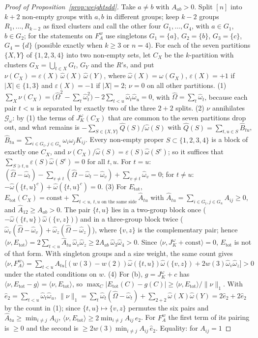 \documentclass[11pt,a4paper]{article}
\theoremstyle{plain}
\theoremstyle{definition}
\theoremstyle{remark}
\newcommand{\tot}{\mathrm{tot}}
\begin{document}
\begin{proof}[Proof of Proposition~\ref{prop:weightsdd}]
Take $a\ne b$ with $A_{ab}>0$. Split $[n]$ into $k+2$ non-empty groups with $a,b$ in different groups; keep $k-2$ groups $R_1,\dots,R_{k-2}$ as fixed clusters and call the other four $G_1,\dots,G_4$, with $a\in G_1$, $b\in G_2$; for the statements on $F^w_A$ use singletons $G_1=\{a\}$, $G_2=\{b\}$, $G_3=\{c\}$, $G_4=\{d\}$ (possible exactly when $k\ge3$ or $n=4$). For each of the seven partitions $\{X,Y\}$ of $\{1,2,3,4\}$ into two non-empty sets, let $C_X$ be the $k$-partition with clusters $G_X=\bigcup_{t\in X}G_t$, $G_Y$ and the $R$'s, and put $\nu(C_X)=\varepsilon(X)\,\hat\omega(X)\,\hat\omega(Y)$, where $\hat\omega(X)=\omega(G_X)$, $\varepsilon(X)=+1$ if $|X|\in\{1,3\}$ and $\varepsilon(X)=-1$ if $|X|=2$; $\nu=0$ on all other partitions. (1) $\sum_X\nu(C_X)=\bigl(\hat\Omega^2-\sum_t\hat\omega_t^2\bigr)-2\sum_{t<u}\hat\omega_t\hat\omega_u=0$, with $\hat\Omega=\sum_t\hat\omega_t$, because each pair $t<u$ is separated by exactly two of the three $2{+}2$ splits. (2) $\nu$ annihilates $\mathcal G_\omega$: by (1) the terms of $J^\omega_K(C_X)$ that are common to the seven partitions drop out, and what remains is $-\sum_{S\in\{X,Y\}}\hat Q(S)/\hat\omega(S)$ with $\hat Q(S)=\sum_{t,u\in S}\hat B_{tu}$, $\hat B_{tu}=\sum_{i\in G_t,j\in G_u}\omega_i\omega_jK_{ij}$. Every non-empty proper $S\subset\{1,2,3,4\}$ is a block of exactly one $C_X$, and $\nu(C_X)/\hat\omega(S)=\varepsilon(S)\hat\omega(S^c)$; so it suffices that $\sum_{S\ni t,u}\varepsilon(S)\hat\omega(S^c)=0$ for all $t,u$. For $t=u$: $(\hat\Omega-\hat\omega_t)-\sum_{v\ne t}(\hat\Omega-\hat\omega_t-\hat\omega_v)+\sum_{v\ne t}\hat\omega_v=0$; for $t\ne u$: $-\hat\omega(\{t,u\}^c)+\hat\omega(\{t,u\}^c)=0$. (3) For $E_\tot$, $E_\tot(C_X)=\mathrm{const}+\sum_{t<u,\ t,u\text{ on the same side}}\hat A_{tu}$ with $\hat A_{tu}=\sum_{i\in G_t,j\in G_u}A_{ij}\ge0$, and $\hat A_{12}\ge A_{ab}>0$. The pair $\{t,u\}$ lies in a two-group block once ($-\hat\omega(\{t,u\})\hat\omega(\{v,z\})$) and in a three-group block twice ($\hat\omega_v(\hat\Omega-\hat\omega_v)+\hat\omega_z(\hat\Omega-\hat\omega_z)$), where $\{v,z\}$ is the complementary pair; hence $\langle\nu,E_\tot\rangle=2\sum_{t<u}\hat A_{tu}\,\hat\omega_v\hat\omega_z\ge2A_{ab}\,\hat\omega_3\hat\omega_4>0$. Since $\langle\nu,J^\omega_K+\mathrm{const}\rangle=0$, $E_\tot$ is not of that form. With singleton groups and a size weight, the same count gives $\langle\nu,F^w_A\rangle=\sum_{t<u}A_{tu}\bigl[(w(3)-w(2))\hat\omega(\{t,u\})\hat\omega(\{v,z\})+2w(3)\hat\omega_v\hat\omega_z\bigr]>0$ under the stated conditions on $w$. (4) For (b), $g=J^\omega_K+c$ has $\langle\nu,E_\tot-g\rangle=\langle\nu,E_\tot\rangle$, so $\max_C|E_\tot(C)-g(C)|\ge\langle\nu,E_\tot\rangle/\lVert\nu\rVert_1$. With $\hat e_2=\sum_{t<u}\hat\omega_t\hat\omega_u$, $\lVert\nu\rVert_1=\sum_t\hat\omega_t(\hat\Omega-\hat\omega_t)+\sum_{2+2}\hat\omega(X)\hat\omega(Y)=2\hat e_2+2\hat e_2$ by the count in (1); since $\{t,u\}\mapsto\{v,z\}$ permutes the six pairs and $\hat A_{tu}\ge\min_{i\ne j}A_{ij}$, $\langle\nu,E_\tot\rangle\ge2\min_{i\ne j}A_{ij}\,\hat e_2$. For $F^w_A$ the first term of its pairing is $\ge0$ and the second is $\ge2w(3)\min_{i\ne j}A_{ij}\,\hat e_2$. Equality: for $A_{ij}=1$ 
\end{proof}
\end{document}
